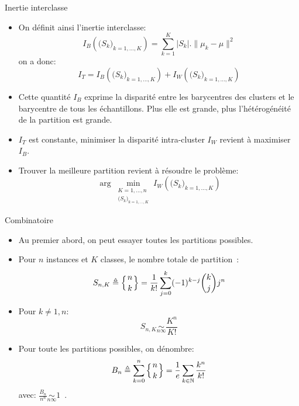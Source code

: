 \documentclass[8pt]{beamer}
\begin{document}
			\begin{frame}{Inertie interclasse}
				\begin{itemize}
					\item<1-> On définit ainsi l'inertie interclasse:
						\begin{equation}
							I_B(\big(S_k\big)_{k = 1, \dots, K}) = \sum_{k= 1}^{K} \vert S_k \vert . \lVert \mu_k - \mu \rVert^2
						\end{equation}
						on a donc:
						\begin{equation}
							I_T = I_B(\big(S_k\big)_{k = 1, \dots, K}) + I_W(\big(S_k\big)_{k = 1, \dots, K})
						\end{equation}
					\item<2-> Cette quantité \(I_B\) exprime la disparité entre les barycentres des clusters et le barycentre de tous les échantillons. Plus elle est grande, plus l'hétérogénéité de la partition est grande.
					\item<3-> \(I_T\) est constante, minimiser la disparité intra-cluster \(I_W\) revient à maximiser \(I_B\).
					\item<4-> Trouver la meilleure partition revient à résoudre le problème:
						\begin{equation}
							\arg \min_{\substack{K = 1,\dots,n \\ \big(S_k\big)_{k = 1, \dots, K}}} I_W(\big(S_k\big)_{k = 1, \dots, K})
						\end{equation}
				\end{itemize}
			\end{frame}

			\begin{frame}{Combinatoire}
				\begin{itemize}
					\item<1-> Au premier abord, on peut essayer toutes les partitions possibles.
					\item<2-> Pour \(n\) instances et \(K\) classes, le nombre totale de partition~\cite{StirlingWiki}:
						\begin{equation}
							S_{n,K} \triangleq \left\{ {n \atop k}\right\} = \frac{1}{k!}\sum_{j=0}^{k} (-1)^{k-j} \binom{k}{j} j^n
						\end{equation}
					\item<3-> Pour \(k \neq 1, n\):
						\begin{equation}
							S_{n,K} \underset{n\infty}{\sim} \frac{K^n}{K!}
						\end{equation}
					\item<4-> Pour toute les partitions possibles, on dénombre:
						\begin{equation}
							B_n \triangleq \sum_{k=0}^n \left\{ {n \atop k}\right\} = \frac{1}{e}\sum_{k\in\mathbb{N}} \frac{k^n}{k!}
						\end{equation}
						avec: \(\frac{B_n}{n^n} \underset{n\infty}{\sim} 1\)~\cite{BellWiki}.
				\end{itemize}
			\end{frame}
\end{document}
